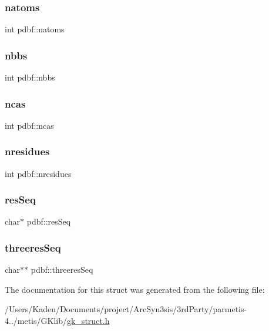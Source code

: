 \mbox{\label{a00666_a6752def7d72ee73480a9fad514e60aef}} 
\subsubsection{\texorpdfstring{natoms}{natoms}}
{\footnotesize\ttfamily int pdbf\+::natoms}

\mbox{\label{a00666_a9d9dbad94b94f067e3ab58334c9e892f}} 
\subsubsection{\texorpdfstring{nbbs}{nbbs}}
{\footnotesize\ttfamily int pdbf\+::nbbs}

\mbox{\label{a00666_a7d28e61b01058ba61fb34b7b4b50e044}} 
\subsubsection{\texorpdfstring{ncas}{ncas}}
{\footnotesize\ttfamily int pdbf\+::ncas}

\mbox{\label{a00666_a4172474fbba5b2127ab8e3184c63a059}} 
\subsubsection{\texorpdfstring{nresidues}{nresidues}}
{\footnotesize\ttfamily int pdbf\+::nresidues}

\mbox{\label{a00666_a6be2fde75925c5a1064dfecd700dc79f}} 
\subsubsection{\texorpdfstring{res\+Seq}{resSeq}}
{\footnotesize\ttfamily char$\ast$ pdbf\+::res\+Seq}

\mbox{\label{a00666_a2d79aa1e5f0634b5e4ceb22d1b2f2462}} 
\subsubsection{\texorpdfstring{threeres\+Seq}{threeresSeq}}
{\footnotesize\ttfamily char$\ast$$\ast$ pdbf\+::threeres\+Seq}



The documentation for this struct was generated from the following file\+:\begin{DoxyCompactItemize}
\item 
/\+Users/\+Kaden/\+Documents/project/\+Arc\+Syn3sis/3rd\+Party/parmetis-\/4../metis/\+G\+Klib/\hyperlink{a00080}{gk\+\_\+struct.\+h}\end{DoxyCompactItemize}
